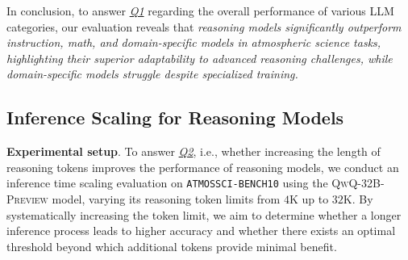 In conclusion, to answer \textit{\underline{Q1}} regarding the overall performance of various LLM categories, our evaluation reveals that \textit{reasoning models significantly outperform instruction, math, and domain-specific models in atmospheric science tasks, highlighting their superior adaptability to advanced reasoning challenges, while domain-specific models struggle despite specialized training.} 




\subsection{Inference Scaling for Reasoning Models}




\textbf{Experimental setup}. 
To answer \textit{\underline{Q2}}, i.e., whether increasing the length of reasoning tokens improves the performance of reasoning models, we conduct an inference time scaling evaluation on \texttt{ATMOSSCI-BENCH10} using the \textsc{QwQ-32B-Preview} model, varying its reasoning token limits from $4$K up to $32$K. %
By systematically increasing the token limit, we aim to determine whether a longer inference process leads to higher accuracy and whether there exists an optimal threshold beyond which additional tokens provide minimal benefit.

